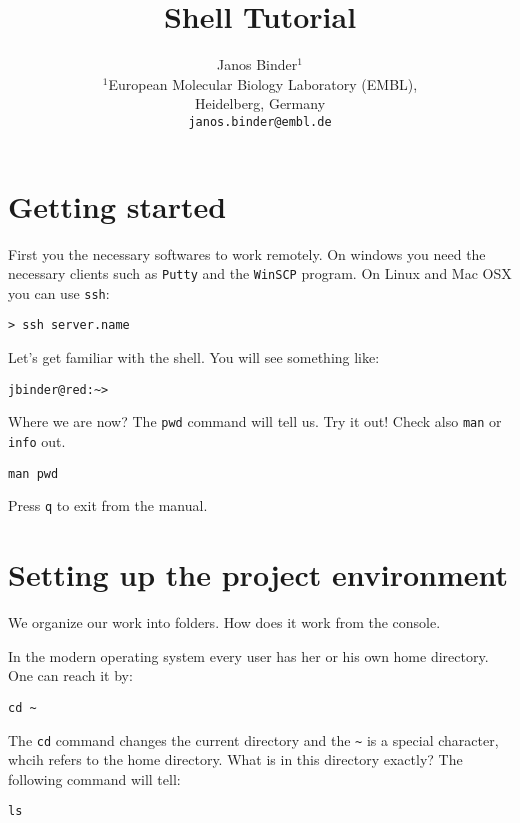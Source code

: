 \documentclass{article}\usepackage[]{graphicx}\usepackage[usenames,dvipsnames]{color}
\title{Shell Tutorial}
\author{Janos Binder$^1$ \\[1em]$^1$European Molecular Biology Laboratory (EMBL),\\ Heidelberg, Germany\\
\texttt{janos.binder@embl.de}}
\begin{document}
\maketitle


\tableofcontents

\section{Getting started} \label{sec:prep}

First you the necessary softwares to work remotely. On windows you need the necessary clients such as \verb+Putty+ and the \verb+WinSCP+ program. On Linux and Mac OSX you can use \verb+ssh+:

\begin{verbatim}
> ssh server.name
\end{verbatim}

Let's get familiar with the shell. You will see something like:

\begin{verbatim}
jbinder@red:~> 
\end{verbatim}

Where we are now? The \verb+pwd+ command will tell us. Try it out! Check also \verb+man+ or \verb+info+ out.

\begin{verbatim}
man pwd
\end{verbatim}

Press \verb+q+ to exit from the manual.

\section{Setting up the project environment}

We organize our work into folders. How does it work from the console. 

In the modern operating system every user has her or his own home directory. One can reach it by:

\begin{verbatim}
cd ~
\end{verbatim}

The \verb+cd+ command changes the current directory and the \verb+~+ is a special character, whcih refers to the home directory. What is in this directory exactly? The following command will tell:

\begin{verbatim}
ls
\end{verbatim}
\end{document}
